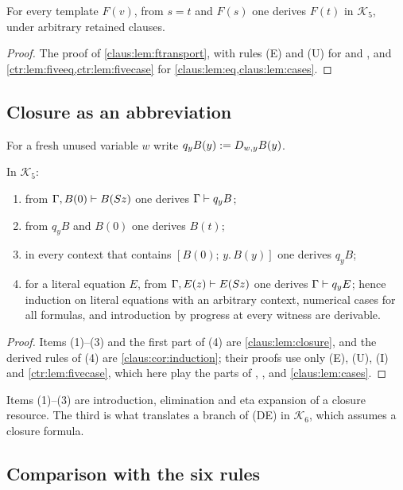 \begin{lemma}\label{ctr:lem:fivetransport}
For every template $F(v)$, from $s=t$ and $F(s)$ one derives $F(t)$ in $\mathcal K_5$, under
arbitrary retained clauses.
\end{lemma}
\begin{proof}
The proof of \cref{claus:lem:ftransport}, with rules (E) and (U) for  and
, and \cref{ctr:lem:fiveeq,ctr:lem:fivecase} for
\cref{claus:lem:eq,claus:lem:cases}.
\end{proof}

\subsection{Closure as an abbreviation}

For a fresh unused variable $w$ write $q_yB(y)\mathrel{:=}D_{w,y}B(y)$.

\begin{lemma}\label{ctr:lem:fiveclosure}
In $\mathcal K_5$:
\begin{enumerate}
\item from $\Gamma,B(0)\vdash B(S z)$ one derives $\Gamma\vdash q_yB$;
\item from $q_yB$ and $B(0)$ one derives $B(t)$;
\item in every context that contains $[B(0);\,y.\,B(y)]$ one derives $q_yB$;
\item for a literal equation $E$, from $\Gamma,E(z)\vdash E(S z)$ one derives
$\Gamma\vdash q_yE$; hence induction on literal equations with an arbitrary context,
numerical cases for all formulas, and introduction by progress at every witness are
derivable.
\end{enumerate}
\end{lemma}
\begin{proof}
Items (1)--(3) and the first part of (4) are \cref{claus:lem:closure}, and the derived rules
of (4) are \cref{claus:cor:induction}; their proofs use only (E), (U), (I) and
\cref{ctr:lem:fivecase}, which here play the parts of , ,
 and \cref{claus:lem:cases}.
\end{proof}

Items (1)--(3) are introduction, elimination and eta expansion of a closure resource. The
third is what translates a branch of (DE) in $\mathcal K_6$, which assumes a closure formula.

\subsection{Comparison with the six rules}

